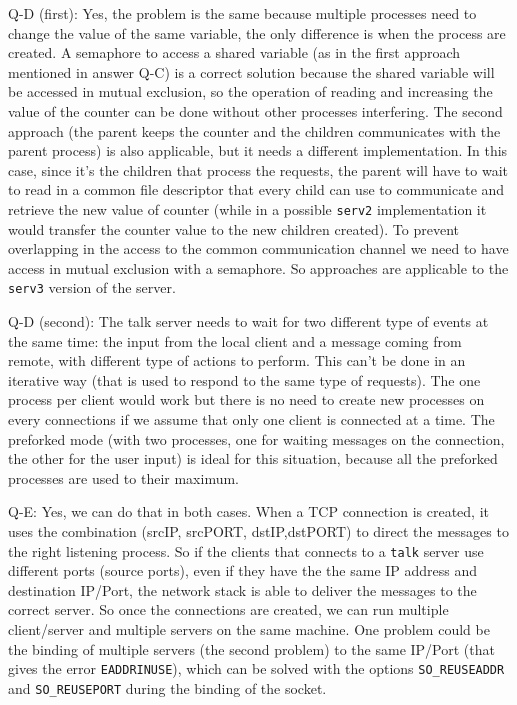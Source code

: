 Q-D (first): Yes, the problem is the same because multiple processes need to change the value of the same variable, the only difference is when the process are created. A semaphore to access a shared variable (as in the first approach mentioned in answer Q-C) is a correct solution because the shared variable will be accessed in mutual exclusion, so the operation of reading and increasing the value of the counter can be done without other processes interfering. The second approach (the parent keeps the counter and the children communicates with the parent process) is also applicable, but it needs a different implementation. In this case, since it's the children that process the requests, the parent will have to wait to read in a common file descriptor that every child can use to communicate and retrieve the new value of counter (while in a possible \texttt{serv2} implementation it would transfer the counter value to the new children created). To prevent overlapping in the access to the common communication channel we need to have access in mutual exclusion with a semaphore. So approaches are applicable to the \texttt{serv3} version of the server. \newline


Q-D (second): The talk server needs to wait for two different type of events at the same time: the input from the local client and a message coming from remote, with different type of actions to perform. This can't be done in an iterative way (that is used to respond to the same type of requests). The one process per client would work but there is no need to create new processes on every connections if we assume that only one client is connected at a time. The preforked mode (with two processes, one for waiting messages on the connection, the other for the user input) is ideal for this situation, because all the preforked processes are used to their maximum. \newline

Q-E: Yes, we can do that in both cases. When a TCP connection is created, it uses the combination (srcIP, srcPORT, dstIP,dstPORT) to direct the messages to the right listening process. So if the clients that connects to a \texttt{talk} server use different ports (source ports), even if they have the the same IP address and destination IP/Port, the network stack is able to deliver the messages to the correct server. So once the connections are created, we can run multiple client/server and multiple servers on the same machine. One problem could be the binding of multiple servers (the second problem) to the same IP/Port (that gives the error \texttt{EADDRINUSE}), which can be solved with the options \texttt{SO\_REUSEADDR} and \texttt{SO\_REUSEPORT} during the binding of the socket. \newline

